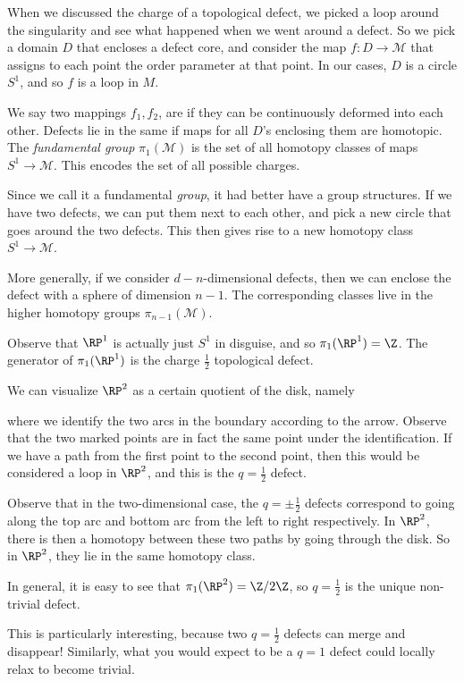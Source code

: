 \documentclass[a4paper]{article}
\begin{document}
When we discussed the charge of a topological defect, we picked a loop around the singularity and see what happened when we went around a defect. So we pick a domain $D$ that encloses a defect core, and consider the map $f: D \to \mathcal{M}$ that assigns to each point the order parameter at that point. In our cases, $D$ is a circle $S^1$, and so $f$ is a loop in $M$.

We say two mappings $f_1, f_2$, are  if they can be continuously deformed into each other. Defects lie in the same  if maps for all $D$'s enclosing them are homotopic. The \emph{fundamental group} $\pi_1(\mathcal{M})$ is the set of all homotopy classes of maps $S^1 \to \mathcal{M}$. This encodes the set of all possible charges.

Since we call it a fundamental \emph{group}, it had better have a group structures. If we have two defects, we can put them next to each other, and pick a new circle that goes around the two defects. This then gives rise to a new homotopy class $S^1 \to \mathcal{M}$.

More generally, if we consider $d - n$-dimensional defects, then we can enclose the defect with a sphere of dimension $n - 1$. The corresponding classes live in the higher homotopy groups $\pi_{n - 1}(\mathcal{M})$.

\begin{eg}
  Observe that $\RP^1$ is actually just $S^1$ in disguise, and so $\pi_1(\RP^1) = \Z$. The generator of $\pi_1(\RP^1)$ is the charge $\frac{1}{2}$ topological defect.
\end{eg}

\begin{eg}
  We can visualize $\RP^2$ as a certain quotient of the disk, namely
  \begin{center}
  \end{center}
  where we identify the two arcs in the boundary according to the arrow. Observe that the two marked points are in fact the same point under the identification. If we have a path from the first point to the second point, then this would be considered a loop in $\RP^2$, and this is the $q = \frac{1}{2}$ defect.
  
  Observe that in the two-dimensional case, the $q = \pm \frac{1}{2}$ defects correspond to going along the top arc and bottom arc from the left to right respectively. In $\RP^2$, there is then a homotopy between these two paths by going through the disk. So in $\RP^2$, they lie in the same homotopy class.

  In general, it is easy to see that $\pi_1(\RP^2) = \Z/2\Z$, so $q = \frac{1}{2}$ is the unique non-trivial defect.
\end{eg}
This is particularly interesting, because two $q = \frac{1}{2}$ defects can merge and disappear! Similarly, what you would expect to be a $q = 1$ defect could locally relax to become trivial.
\end{document}
